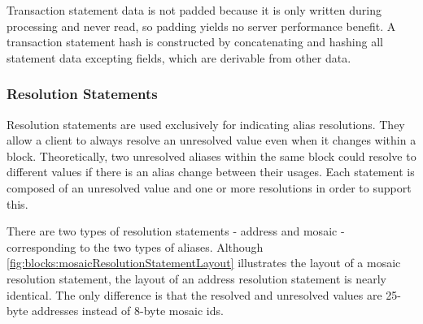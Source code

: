 Transaction statement data is not padded because it is only written during processing and never read, so padding yields no server performance benefit.
A transaction statement hash is constructed by concatenating and hashing all statement data excepting  fields, which are derivable from other data.

\subsubsection{Resolution Statements}

Resolution statements are used exclusively for indicating alias resolutions.
They allow a client to always resolve an unresolved value even when it changes within a block.
Theoretically, two unresolved aliases within the same block could resolve to different values if there is an alias change between their usages.
Each statement is composed of an unresolved value and one or more resolutions in order to support this.

There are two types of resolution statements - address and mosaic - corresponding to the two types of aliases.
Although \autoref{fig:blocks:mosaicResolutionStatementLayout} illustrates the layout of a mosaic resolution statement, the layout of an address resolution statement is nearly identical.
The only difference is that the resolved and unresolved values are 25-byte addresses instead of 8-byte mosaic ids.

\begin{figure}[H]
\end{figure}

